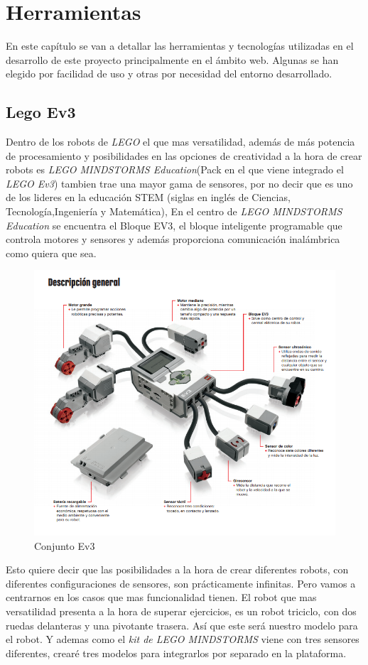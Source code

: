 \chapter{Herramientas}
\label{chap:herramientas}
En este capítulo se van a detallar las herramientas y tecnologías utilizadas en el desarrollo de este proyecto principalmente en el ámbito web. Algunas se han elegido por facilidad de uso y otras por necesidad del entorno desarrollado.

\section{Lego Ev3}
\label{sec:caracteristicas} 
Dentro de los robots de \textit{LEGO} el que mas versatilidad, además de más potencia de procesamiento y posibilidades en las opciones de creatividad a la hora de crear robots es \textit{LEGO MINDSTORMS Education}(Pack en el que viene integrado el \textit{LEGO Ev3}) tambien trae una mayor gama de sensores, por no decir que es uno de los lideres en la educación STEM (siglas en inglés de Ciencias, Tecnología,Ingeniería y Matemática), En el centro de \textit{LEGO MINDSTORMS Education} se encuentra el Bloque EV3, el bloque inteligente programable que controla motores y sensores y además proporciona comunicación inalámbrica como quiera que sea.
 \begin{figure}[H]
    \centering
    \includegraphics[scale=0.7]{img/partes.png}
    \caption{Conjunto Ev3} \label{fig:partes}
\end{figure}
 Esto quiere decir que las posibilidades a la hora de crear diferentes robots, con diferentes configuraciones de sensores, son prácticamente infinitas. Pero vamos a centrarnos en los casos que mas funcionalidad tienen. El robot que mas versatilidad presenta a la hora de superar ejercicios, es un robot triciclo, con dos ruedas delanteras y una pivotante trasera. Así que este será nuestro modelo para el robot. Y ademas como el \textit{kit de LEGO MINDSTORMS} viene con tres sensores diferentes, crearé tres modelos para integrarlos por separado en la plataforma.

